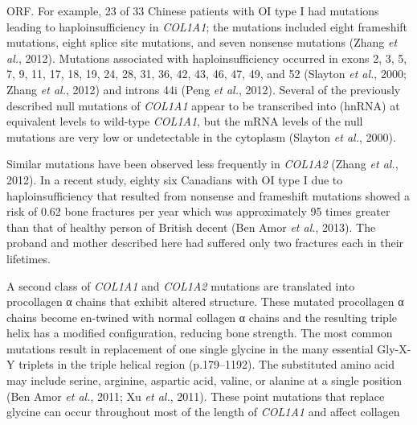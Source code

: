                 ORF. For example, 23 of 33 Chinese patients with OI type I had mutations leading to
                haploinsufficiency in \textit{COL1A1}; the mutations included eight
                frameshift mutations, eight splice site mutations, and seven nonsense mutations
                    (Zhang \textit{et al.}, 2012).
                Mutations associated with haploinsufficiency occurred in exons 2, 3, 5, 7, 9, 11,
                17, 18, 19, 24, 28, 31, 36, 42, 43, 46, 47, 49, and 52 (Slayton \textit{et al.}, 2000; Zhang \textit{et al.}, 2012) and introns 44i
                    (Peng \textit{et al.}, 2012).
                Several of the previously described null mutations of \textit{COL1A1} appear
                to be transcribed into (hnRNA) at equivalent levels to wild-type
                    \textit{COL1A1}, but the mRNA levels of the null mutations are very low
                or undetectable in the cytoplasm (Slayton \textit{et
                        al.}, 2000).\par Similar mutations have been observed less frequently in \textit{COL1A2}
                    (Zhang \textit{et al.}, 2012). In
                a recent study, eighty six Canadians with OI type I due to haploinsufficiency that
                resulted from nonsense and frameshift mutations showed a risk of 0.62 bone fractures
                per year which was approximately 95 times greater than that of healthy person of
                British decent (Ben Amor \textit{et al.},
                    2013). The proband and mother described here had suffered only two
                fractures each in their lifetimes.\par A second class of \textit{COL1A1} and \textit{COL1A2} mutations are
                translated into procollagen α chains that exhibit altered structure. These mutated
                procollagen α chains become en-twined with normal collagen α chains and the
                resulting triple helix has a modified configuration, reducing bone strength. The
                most common mutations result in replacement of one single glycine in the many
                essential Gly-X-Y triplets in the triple helical region (p.179–1192). The
                substituted amino acid may include serine, arginine, aspartic acid, valine, or
                alanine at a single position (Ben Amor \textit{et
                        al.}, 2011; Xu \textit{et
                        al.}, 2011). These point mutations that replace glycine can
                occur throughout most of the length of \textit{COL1A1} and affect collagen
